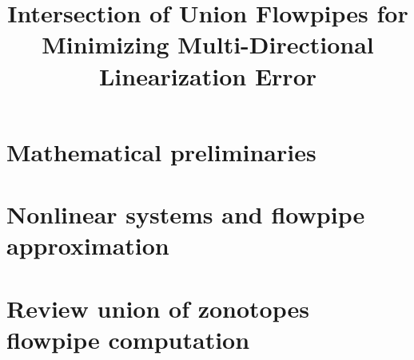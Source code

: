 


\title{Intersection of Union Flowpipes for Minimizing Multi-Directional Linearization Error}
\author{}
\institute{}
%
    
\maketitle

\section{Mathematical preliminaries}


\section{Nonlinear systems and flowpipe approximation}


\section{Review union of zonotopes flowpipe computation}






